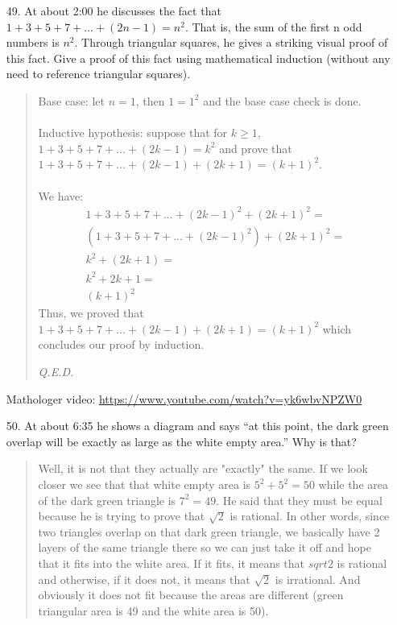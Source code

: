 \documentclass[12pt, a4paper]{article}                      %
\begin{document}
\begin{itemize}
\item[49.]
At about 2:00 he discusses the fact that $1 + 3 + 5 + 7 + ... + (2n - 1) = n^2$. That is,
the sum of the first n odd numbers is $n^2$. Through triangular squares, he gives a
striking visual proof of this fact. Give a proof of this fact using mathematical induction
(without any need to reference triangular squares).
\begin{quote}
Base case: let $n = 1$, then $1 = 1^2$ and the base case check is done.\\\\
Inductive hypothesis: suppose that for $k \geq 1$, $1 + 3 + 5 + 7 + ... + (2k - 1) = k^2$
and prove that $1 + 3 + 5 + 7 + ... + (2k - 1) + (2k + 1) = (k + 1)^2$.\\\\
We have:
\begin{align*}
1 + 3 + 5 + 7 + ... + (2k - 1)^2 + (2k + 1)^2 =\\
(1 + 3 + 5 + 7 + ... + (2k - 1)^2) + (2k + 1)^2 =\\
k^2 + (2k + 1) =\\
k^2 + 2k + 1 =\\
(k + 1)^2
\end{align*}
Thus, we proved that $1 + 3 + 5 + 7 + ... + (2k - 1) + (2k + 1) = (k + 1)^2$ which
concludes our proof by induction.
\begin{flushright}
\textit{Q.E.D.}
\end{flushright}
\end{quote}

\item[]
\item[]
\item[]
{\large Mathologer video: \url{https://www.youtube.com/watch?v=yk6wbvNPZW0}}

\item[50.]
At about 6:35 he shows a diagram and says “at this point, the dark green overlap will
be exactly as large as the white empty area.” Why is that?
\begin{quote}
Well, it is not that they actually are "exactly" the same. If we look closer we see that
that white empty area is $5^2 + 5^2 = 50$ while the area of the dark green triangle is $7^2 = 49$.
He said that they must be equal because he is trying to prove that $\sqrt{2}$ is rational. In other words,
since two triangles overlap on that dark green triangle, we basically have 2 layers of the same triangle
there so we can just take it off and hope that it fits into the white area. If it fits, it means that $sqrt{2}$
is rational and otherwise, if it does not, it means that $\sqrt{2}$ is irrational. And obviously it does not fit
because the areas are different (green triangular area is 49 and the white area is 50).
\end{quote}


\end{itemize}
\end{document}

